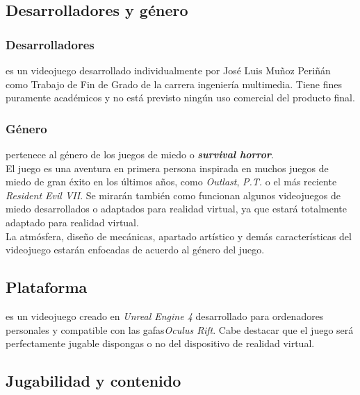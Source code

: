 \subsection{Desarrolladores y género}

\subsubsection{Desarrolladores}

\textbf{\nombreJuego} es un videojuego desarrollado individualmente por José Luis Muñoz Periñán como Trabajo de Fin de Grado de la carrera ingeniería multimedia. Tiene fines puramente académicos y no está previsto ningún uso comercial del producto final.

\subsubsection{Género}

\nombreJuego pertenece al género de los juegos de miedo o \textbf{\textit{survival horror}}.
\\

El juego es una aventura en primera persona inspirada en muchos juegos de miedo de gran éxito en los últimos años, como \textit{Outlast}, \textit{P.T.} o el más reciente \textit{Resident Evil VII}. Se mirarán también como funcionan algunos videojuegos de miedo desarrollados o adaptados para realidad virtual, ya que \nombreJuego estará totalmente adaptado para realidad virtual.
\\

La atmósfera, diseño de mecánicas, apartado artístico y demás características del videojuego estarán enfocadas de acuerdo al género del juego.
\\

\subsection{Plataforma}

\nombreJuego es un videojuego creado en \textit{Unreal Engine 4} desarrollado para ordenadores personales y compatible con las gafas\textit{Oculus Rift}. Cabe destacar que el juego será perfectamente jugable dispongas o no del dispositivo de realidad virtual.
\\

\subsection{Jugabilidad y contenido}

